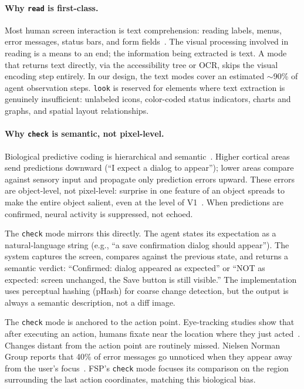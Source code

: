 \documentclass[11pt,a4paper]{article}
\begin{document}
\paragraph{Why \texttt{read} is first-class.}
Most human screen interaction is text comprehension: reading labels, menus,
error messages, status bars, and form
fields~\cite{rayner-eye-movements}. The visual processing involved in
reading is a means to an end; the information being extracted is text.
A mode that returns text directly, via the accessibility tree or OCR, skips the
visual encoding step entirely. In our design, the text modes cover an estimated $\sim$90\%
of agent observation steps. \texttt{look} is reserved for
elements where text extraction is genuinely insufficient: unlabeled icons,
color-coded status indicators, charts and graphs, and spatial layout
relationships.

\paragraph{Why \texttt{check} is semantic, not pixel-level.}
Biological predictive coding is hierarchical and
semantic~\cite{rao-ballard-1999,friston2005theory}. Higher cortical areas send
predictions downward (``I expect a dialog to appear''); lower areas compare
against sensory input and propagate only prediction errors upward.
These errors are object-level, not pixel-level: surprise in one feature of an
object spreads to make the entire object salient, even at the level of
V1~\cite{keller2018predictive}. When predictions are confirmed, neural
activity is suppressed, not echoed.

The \texttt{check} mode mirrors this directly. The agent states its expectation
as a natural-language string (e.g., ``a save confirmation dialog should
appear''). The system captures the screen, compares against the previous state,
and returns a semantic verdict: ``Confirmed: dialog appeared as expected'' or
``NOT as expected: screen unchanged, the Save button is still visible.'' The
implementation uses perceptual hashing (pHash) for coarse change detection,
but the output is always a semantic description, not a diff image.

The \texttt{check} mode is anchored to the action point. Eye-tracking
studies show that after executing an action, humans fixate near the location
where they just acted~\cite{gui-eye-tracking}. Changes distant from the
action point are routinely missed. Nielsen Norman Group reports that 40\% of
error messages go unnoticed when they appear away from the user's
focus~\cite{nngroup-change-blindness}. FSP's \texttt{check} mode focuses its
comparison on the region surrounding the last action coordinates, matching this
biological bias.
\end{document}
